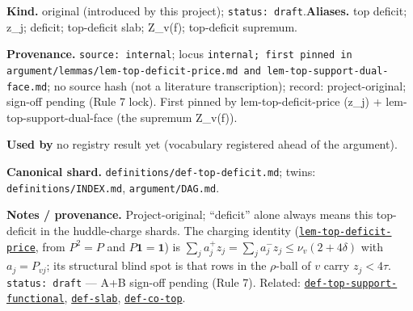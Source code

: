 \begin{defnote}
\textbf{Kind.} original (introduced by this project); \texttt{status: draft}.\quad\textbf{Aliases.} top deficit; z\_j; deficit; top-deficit slab; Z\_v(f); top-deficit supremum.
\par
\textbf{Provenance.} \texttt{source: internal}; locus \texttt{internal;\allowbreak{} first pinned in argument/\allowbreak{}lemmas/\allowbreak{}lem-\allowbreak{}top-\allowbreak{}deficit-\allowbreak{}price.\allowbreak{}md and lem-\allowbreak{}top-\allowbreak{}support-\allowbreak{}dual-\allowbreak{}face.\allowbreak{}md}; no source hash (not a literature transcription); record: project-\allowbreak{}original;\allowbreak{} sign-\allowbreak{}off pending (Rule 7 lock).\allowbreak{} First pinned by lem-\allowbreak{}top-\allowbreak{}deficit-\allowbreak{}price (z\_j) + lem-\allowbreak{}top-\allowbreak{}support-\allowbreak{}dual-\allowbreak{}face (the supremum Z\_v(f)).
\par
\textbf{Used by} no registry result yet (vocabulary registered ahead of the argument).
\par
\textbf{Canonical shard.} \texttt{definitions/\allowbreak{}def-\allowbreak{}top-\allowbreak{}deficit.\allowbreak{}md}; twins: \texttt{definitions/INDEX.md}, \texttt{argument/DAG.md}.
\par
\textbf{Notes / provenance.} Project-original; ``deficit'' alone always means this top-deficit in the
huddle-charge shards. The charging identity (\hyperlink{dag:lem-top-deficit-price}{\texttt{lem-\allowbreak{}top-\allowbreak{}deficit-\allowbreak{}price}}, from $P^2=P$ and $P\mathbf1=\mathbf1$)
is $\sum_j a_j^+z_j=\sum_j a_j^-z_j\le\nu_v(2+4\delta)$ with $a_j=P_{vj}$; its structural blind spot is
that rows in the $\rho$-ball of $v$ carry $z_j<4\tau$. \texttt{status:\allowbreak{} draft} --- A+B sign-off pending (Rule 7).
Related: \hyperref[def:top-support-functional]{\texttt{def-\allowbreak{}top-\allowbreak{}support-\allowbreak{}functional}}, \hyperref[def:slab]{\texttt{def-\allowbreak{}slab}}, \hyperref[def:co-top]{\texttt{def-\allowbreak{}co-\allowbreak{}top}}.
\end{defnote}

